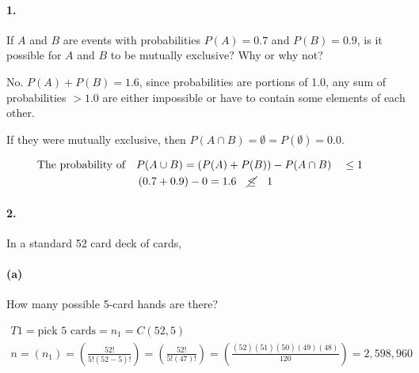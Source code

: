 

\renewcommand\assignment{Worksheet 5, due Monday January 30, 4:15pm}

\def\firstcircle{(0:1.75cm) circle (2.5cm)}
\def\secondcircle{(180:1.75cm) circle (2.5cm)}



    \paragraph*{1.}
    If $A$ and $B$ are events with probabilities $P (A) = 0.7$ and $P (B) = 0.9$, is it possible for $A$ and $B$ to be mutually exclusive? Why or why not?
    
    \begin{mdframed}
        No. $P(A) + P(B) = 1.6$, since probabilities are portions of 1.0, any sum of probabilities $> 1.0$ are either impossible or have to contain some elements of each other.

        If they were mutually exclusive, then $P(A \cap B) = \emptyset = P(\emptyset) = 0.0$.

        \begin{equation*}
            \begin{gathered}
                \text{The probability of} \quad P(A \cup B) = (P(A) + P(B)) - P(A \cap B) \quad \leq 1 \quad    \\
                (0.7 + 0.9) - 0 = 1.6 \quad \cancel{\leq} \quad 1
            \end{gathered}
        \end{equation*}
        
        
    \end{mdframed}

    \paragraph*{2.}
    In a standard 52 card deck of cards,

    \paragraph*{(a)}
    How many possible 5-card hands are there?

    \begin{mdframed}
        \begin{equation*}
            \begin{gathered}
                T1 = \text{pick 5 cards} = n_1  = C(52,5)  \\
                n = (n_1) = \left(\frac{52!}{5!(52-5)!}\right) = \left(\frac{52!}{5!(47)!}\right) = \left(\frac{(52)(51)(50)(49)(48)}{120}\right) = \boxed{2,598,960}
            \end{gathered}
        \end{equation*}
    \end{mdframed}

